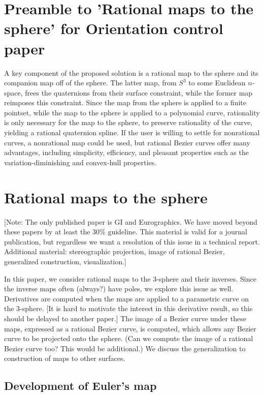 \documentclass[11pt]{article}
\begin{document}
\section{Preamble to 'Rational maps to the sphere' for Orientation control paper}

A key component of the proposed solution is a rational map to the sphere
and its companion map off of the sphere.
The latter map, from $S^3$ to some Euclidean $n$-space, frees the quaternions from
their surface constraint, while the former map reimposes this constraint.
Since the map from the sphere is applied to a finite pointset, while the map
to the sphere is applied to a polynomial curve, rationality is only necessary for the
map to the sphere, to preserve rationality of the curve, yielding a rational
quaternion spline.
If the user is willing to settle for nonrational curves,
a nonrational map could be used,
but rational Bezier curves offer many advantages, including simplicity,
efficiency, and pleasant properties such as the variation-diminishing and convex-hull
properties.

\section{Rational maps to the sphere}

[Note: The only published paper is GI and Eurographics.
We have moved beyond these papers by at least the 30\% guideline.
This material is valid for a journal publication, but regardless we want a resolution
of this issue in a technical report.
Additional material: stereographic projection, image of rational Bezier,
generalized construction, visualization.]

In this paper, we consider rational maps to the 3-sphere and their inverses.
Since the inverse maps often (always?) have poles, we explore this issue as well.
Derivatives are computed when the maps are applied to a parametric curve on 
the 3-sphere.
[It is hard to motivate the interest in this derivative result, so this should
be delayed to another paper.]
The image of a Bezier curve under these maps, expressed as a rational Bezier curve,
is computed, which allows any Bezier curve to be projected onto the sphere.
(Can we compute the image of a rational Bezier curve too? This would be additional.)
We discuss the generalization to construction of maps to other surfaces.

\subsection{Development of Euler's map}
\end{document}
